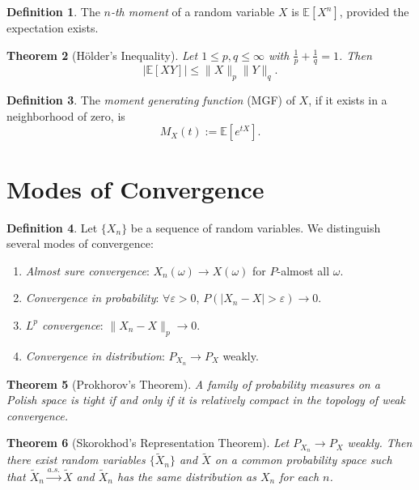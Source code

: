 \documentclass[11pt]{amsart}
\newtheorem{theorem}{Theorem}[section]
\theoremstyle{definition}
\newtheorem{definition}[theorem]{Definition}
\theoremstyle{remark}
\begin{document}
\begin{definition}
The \emph{$n$-th moment} of a random variable $X$ is $\mathbb{E}[X^n]$, provided the expectation exists.
\end{definition}

\begin{theorem}[Hölder's Inequality]
Let $1 \leq p, q \leq \infty$ with $\frac{1}{p} + \frac{1}{q} = 1$. Then
\[
|\mathbb{E}[XY]| \leq \|X\|_p \|Y\|_q.
\]
\end{theorem}

\begin{definition}
The \emph{moment generating function} (MGF) of $X$, if it exists in a neighborhood of zero, is
\[
M_X(t) := \mathbb{E}[e^{tX}].
\]
\end{definition}

\section{Modes of Convergence}

\begin{definition}
Let $\{X_n\}$ be a sequence of random variables. We distinguish several modes of convergence:
\begin{enumerate}[label=(\roman*)]
\item \emph{Almost sure convergence}: $X_n(\omega) \to X(\omega)$ for $P$-almost all $\omega$.
\item \emph{Convergence in probability}: $\forall \varepsilon>0$, $P(|X_n - X| > \varepsilon) \to 0$.
\item \emph{$L^p$ convergence}: $\|X_n - X\|_p \to 0$.
\item \emph{Convergence in distribution}: $P_{X_n} \to P_X$ weakly.
\end{enumerate}
\end{definition}

\begin{theorem}[Prokhorov's Theorem]
A family of probability measures on a Polish space is tight if and only if it is relatively compact in the topology of weak convergence.
\end{theorem}

\begin{theorem}[Skorokhod's Representation Theorem]
Let $P_{X_n} \to P_X$ weakly. Then there exist random variables $\{\tilde{X}_n\}$ and $\tilde{X}$ on a common probability space such that $\tilde{X}_n \xrightarrow{a.s.} \tilde{X}$ and $\tilde{X}_n$ has the same distribution as $X_n$ for each $n$.
\end{theorem}
\end{document}
